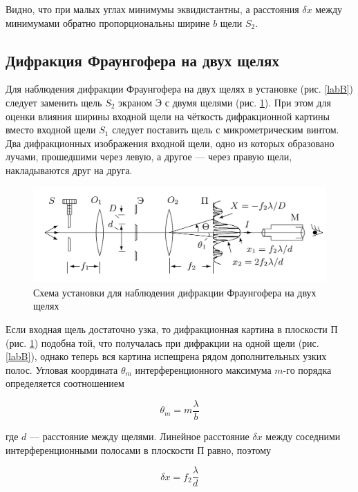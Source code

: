 \documentclass[a4paper,12pt]{article}
\begin{document}
Видно, что при малых углах минимумы эквидистантны, а расстояния $ \delta x $ между минимумами обратно пропорциональны ширине $ b $ щели $ S_2 $.



\subsection{Дифракция Фраунгофера на двух щелях}

Для наблюдения дифракции Фраунгофера на двух щелях в установке (рис. \ref{labB}) следует заменить щель $ S_2 $ экраном Э с двумя щелями
(рис. \ref{labC}). При этом для оценки влияния ширины входной щели на чёткость дифракционной картины вместо входной щели $ S_1 $ следует поставить щель с микрометрическим винтом. Два дифракционных изображения входной щели, одно из которых образовано лучами, прошедшими через левую, а другое --- через правую щели, накладываются друг на друга.

\begin{figure}[H]
	\centering
	\includegraphics[scale=0.15]{clab.jpeg}
	\caption{Схема установки для наблюдения дифракции Фраунгофера на двух щелях}
	\label{labC}
\end{figure}

Если входная щель достаточно узка, то дифракционная картина
в плоскости П (рис. \ref{labC}) подобна той, что получалась при дифракции
на одной щели (рис. \ref{labB}), однако теперь вся картина испещрена рядом
дополнительных узких полос.
Угловая координата $ \theta_m $ интерференционного максимума $ m $-го порядка определяется соотношением

\begin{equation}\label{}
\theta_m = m \dfrac{\lambda}{b}
\end{equation}

где $ d $ --- расстояние между щелями. Линейное расстояние $ \delta x $ между соседними интерференционными полосами в плоскости П равно, поэтому

\begin{equation}\label{dx}
\delta x = f_2 \dfrac{\lambda}{d}
\end{equation}
\end{document}
